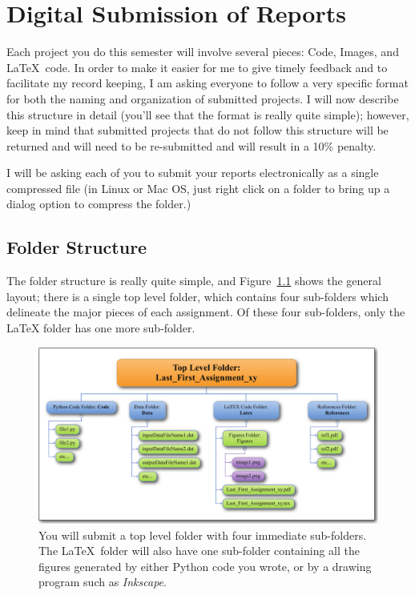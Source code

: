 \chapter{Digital Submission of Reports}
\label{app:submission} %


Each project you do this semester will involve several pieces: Code, Images, and \LaTeX\ code. 
In order to make it easier for me to give timely feedback and to facilitate my record keeping, I am asking everyone
to follow a very specific format for both the naming and organization of submitted projects. I will now describe this structure in detail (you'll see that the format is really quite simple); however, keep in mind that
submitted projects that do not follow this structure will be returned and will need to be re-submitted
and will result in a 10\% penalty. 

I will be asking each of you to submit your reports electronically as a single compressed file (in Linux or Mac OS, just right click on a folder to bring up a dialog option to compress the folder.) 

\section{Folder Structure}\label{sec:Folders}
The folder structure is really quite simple, and Figure~\ref{fig:FolderScheme} shows the general layout; there is a single top level folder, which contains four sub-folders which delineate the major pieces of each assignment. Of these four sub-folders, only the LaTeX folder has one more sub-folder. 
\begin{figure}[htb]
  \includegraphics[width=\textwidth]{Figures/digitalSubmission/folderScheme.pdf}%
  \caption{You will submit a top level folder with four immediate sub-folders.
  The \LaTeX\ folder will also have one sub-folder containing all the figures generated by either Python code you wrote, or by a drawing program such as \emph{Inkscape}.}
  \label{fig:FolderScheme}
\end{figure}

